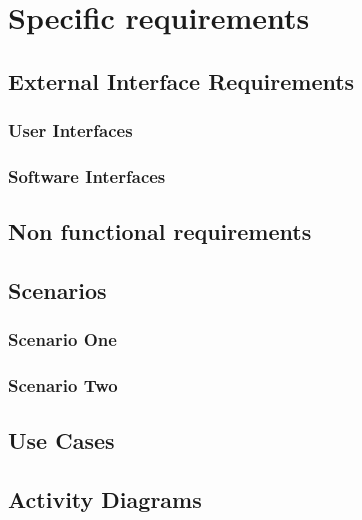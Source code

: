 \documentclass{article}
\begin{document}
\clearpage
\section{Specific requirements}

\subsection{External Interface Requirements}

\subsubsection{User Interfaces}


\clearpage
\subsubsection{Software Interfaces}


\subsection{Non functional requirements}


\subsection{Scenarios}

\subsubsection{Scenario One}


\clearpage
\subsubsection{Scenario Two}


\clearpage
\subsection{Use Cases}



\clearpage
\subsection{Activity Diagrams}

\end{document}
